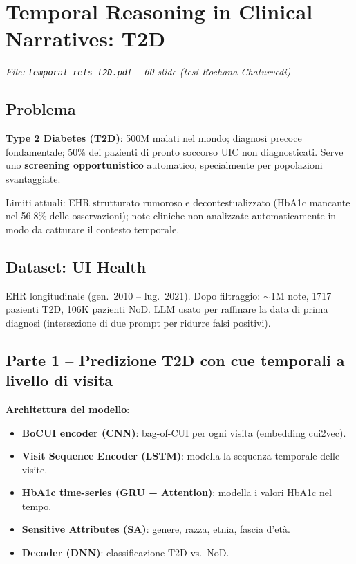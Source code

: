 \documentclass[a4paper,12pt]{article}
\begin{document}
\section{Temporal Reasoning in Clinical Narratives: T2D}
\textit{File: \texttt{temporal-rels-t2D.pdf} -- 60 slide (tesi Rochana Chaturvedi)}

\subsection{Problema}
\textbf{Type 2 Diabetes (T2D)}: 500M malati nel mondo; diagnosi precoce fondamentale; 50\% dei pazienti di pronto soccorso UIC non diagnosticati. Serve uno \textbf{screening opportunistico} automatico, specialmente per popolazioni svantaggiate.

Limiti attuali: EHR strutturato rumoroso e decontestualizzato (HbA1c mancante nel 56.8\% delle osservazioni); note cliniche non analizzate automaticamente in modo da catturare il contesto temporale.

\subsection{Dataset: UI Health}
EHR longitudinale (gen.\ 2010 -- lug.\ 2021). Dopo filtraggio: $\sim$1M note, 1717 pazienti T2D, 106K pazienti NoD. LLM usato per raffinare la data di prima diagnosi (intersezione di due prompt per ridurre falsi positivi).

\subsection{Parte 1 -- Predizione T2D con cue temporali a livello di visita}

\textbf{Architettura del modello}:
\begin{itemize}
    \item \textbf{BoCUI encoder (CNN)}: bag-of-CUI per ogni visita (embedding cui2vec).
    \item \textbf{Visit Sequence Encoder (LSTM)}: modella la sequenza temporale delle visite.
    \item \textbf{HbA1c time-series (GRU + Attention)}: modella i valori HbA1c nel tempo.
    \item \textbf{Sensitive Attributes (SA)}: genere, razza, etnia, fascia d'et\`a.
    \item \textbf{Decoder (DNN)}: classificazione T2D vs.\ NoD.
\end{itemize}
\end{document}
